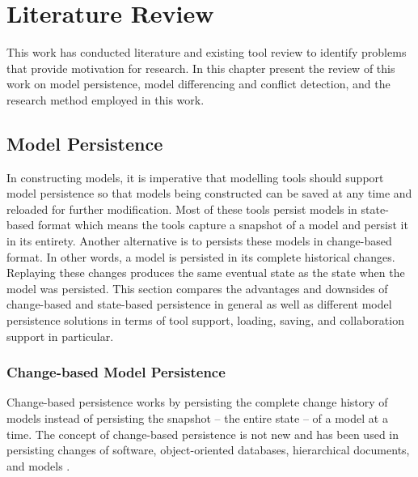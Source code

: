 \chapter{Literature Review}
\label{ch:literature_review}
This work has conducted literature and existing tool review to identify problems that provide motivation for research. In this chapter present the review of this work on model persistence, model differencing and conflict detection, and the research method employed in this work.

\section{Model Persistence}
\label{sec:model_persistence}
In constructing models, it is imperative that modelling tools should support model persistence so that models being constructed can be saved at any time and reloaded for further modification. Most of these tools persist models in state-based format which means the tools capture a snapshot of a model and persist it in its entirety. Another alternative is to persists these models in change-based format. In other words, a model is persisted in its complete historical changes. Replaying these changes produces the same eventual state as the state when the model was persisted. This section compares the advantages and downsides of change-based and state-based persistence in general as well as different model persistence solutions in terms of tool support, loading, saving, and collaboration support in particular. 

\subsection{Change-based Model Persistence}
\label{sec:change_based_model_persistence}
Change-based persistence works by persisting the complete change history of models instead of persisting the snapshot -- the entire state -- of a model at a time. The concept of change-based persistence is not new and has been used in persisting changes of software, object-oriented databases, hierarchical documents, and models 
\cite{DBLP:journals/entcs/RobbesL07,DBLP:conf/sde/LippeO92,DBLP:conf/caise/IgnatN05,koegel2010emfstore}. 

